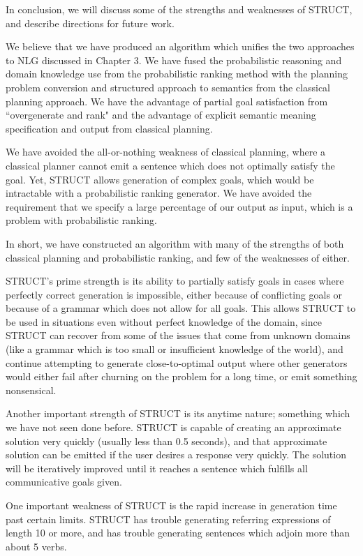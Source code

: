 In conclusion, we will discuss some of the
strengths and weaknesses of STRUCT, and describe
directions for future work.

We believe that we have produced an algorithm which unifies the
two approaches to NLG discussed in Chapter 3.  
We have fused the probabilistic reasoning and
domain knowledge use from the probabilistic ranking method with
the planning problem conversion and structured approach to semantics
from the classical planning approach.  We have the advantage of
partial goal satisfaction from ``overgenerate and rank" and the
advantage of explicit semantic meaning specification and
output from classical planning.

We have avoided the all-or-nothing weakness of classical planning,
where a classical planner cannot emit a sentence which does not
optimally satisfy the goal.  Yet, STRUCT allows generation of complex
goals, which would be intractable with a probabilistic ranking generator.
We have avoided the requirement that we specify a large percentage of
our output as input, which is a problem with probabilistic ranking.

In short, we have constructed an algorithm with many of the strengths
of both classical planning and probabilistic ranking, and few of the
weaknesses of either.

STRUCT's prime strength is its ability to partially satisfy goals in cases where
perfectly correct generation is impossible, either because of conflicting
goals or because of a grammar which does not allow for all goals.
This allows STRUCT to be used in situations even without perfect knowledge
of the domain, since STRUCT can recover from some of the issues that come
from unknown domains (like a grammar which is too small or insufficient knowledge
of the world), and continue attempting to generate close-to-optimal output
where other generators would either fail after churning on the problem
for a long time, or emit something nonsensical.

Another important strength of STRUCT is its anytime nature; something which
we have not seen done before.  STRUCT is capable of creating an approximate
solution very quickly (usually less than 0.5 seconds), and that approximate solution
can be emitted if the user desires a response very quickly.  The solution will be iteratively
improved until it reaches a sentence which fulfills all communicative goals given.

One important weakness of STRUCT is the rapid increase in generation time
past certain limits.  STRUCT has trouble generating referring expressions of
length 10 or more, and has trouble generating sentences which adjoin
more than about 5 verbs.

